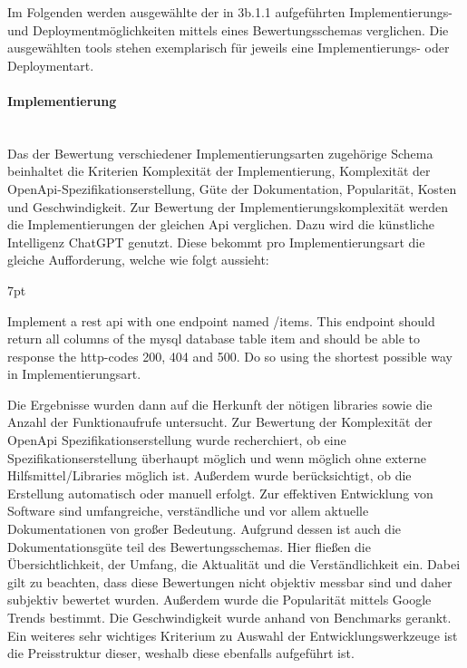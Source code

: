 \documentclass[notitlepage, hidelinks]{article}
\newenvironment{formal}{%
  \def\FrameCommand{%
    \hspace{1pt}%
    {\color{black}\vrule width 2pt}%
    {\color{formalshade}\vrule width 4pt}%
    \colorbox{formalshade}%
  }%
  \MakeFramed{\advance\hsize-\width\FrameRestore}%
  \noindent\hspace{-4.55pt}%
  \begin{adjustwidth}{}{7pt}%
  \vspace{2pt}\vspace{2pt}%
}
{%
  \vspace{2pt}\end{adjustwidth}\endMakeFramed%
}
\begin{document}
Im Folgenden werden ausgewählte der in 3b.1.1 aufgeführten Implementierungs- und Deploymentmöglichkeiten mittels eines Bewertungsschemas verglichen. Die ausgewählten tools stehen exemplarisch für jeweils eine Implementierungs- oder Deploymentart.

\paragraph{Implementierung} \mbox{} \\
Das der Bewertung verschiedener Implementierungsarten zugehörige Schema beinhaltet die Kriterien Komplexität der Implementierung, Komplexität der OpenApi-Spezifikationserstellung, Güte der Dokumentation, Popularität, Kosten und Geschwindigkeit. Zur Bewertung der Implementierungskomplexität werden die Implementierungen der gleichen Api verglichen. Dazu wird die künstliche Intelligenz ChatGPT genutzt. Diese bekommt pro Implementierungsart die gleiche Aufforderung, welche wie folgt aussieht: 
\begin{formal}
Implement a rest api with one endpoint named /items. This endpoint should return all columns of the mysql database table item and should be able to response the http-codes 200, 404 and 500. Do so using the shortest possible way in {Implementierungsart}.
\end{formal}

Die Ergebnisse wurden dann auf die Herkunft der nötigen libraries sowie die Anzahl der Funktionaufrufe untersucht. Zur Bewertung der Komplexität der OpenApi Spezifikationserstellung wurde recherchiert, ob eine Spezifikationserstellung überhaupt möglich und wenn möglich ohne externe Hilfsmittel/Libraries möglich ist. Außerdem wurde berücksichtigt, ob die Erstellung automatisch oder manuell erfolgt. Zur effektiven Entwicklung von Software sind umfangreiche, verständliche und vor allem aktuelle Dokumentationen von großer Bedeutung. Aufgrund dessen ist auch die Dokumentationsgüte teil des Bewertungsschemas. Hier fließen die Übersichtlichkeit, der Umfang, die Aktualität und die Verständlichkeit ein. Dabei gilt zu beachten, dass diese Bewertungen nicht objektiv messbar sind und daher subjektiv bewertet wurden. Außerdem wurde die Popularität mittels Google Trends bestimmt. Die Geschwindigkeit wurde anhand von Benchmarks gerankt. Ein weiteres sehr wichtiges Kriterium zu Auswahl der Entwicklungswerkzeuge ist die Preisstruktur dieser, weshalb diese ebenfalls aufgeführt ist.
\end{document}
